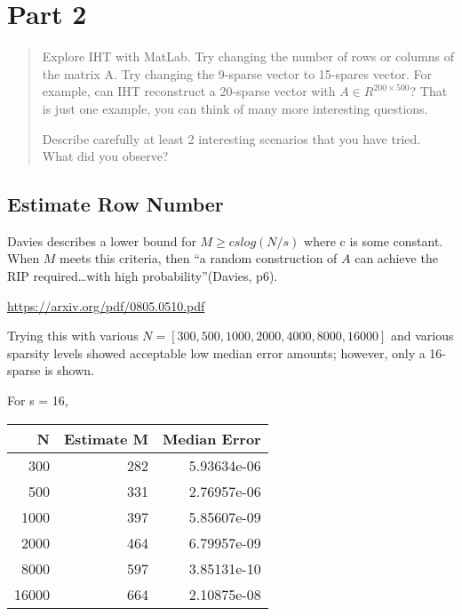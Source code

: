 \documentclass[11pt]{article}
\begin{document}
\section{Part 2}
\label{sec:orgb0db5c3}

\begin{quote}
Explore IHT with MatLab. Try changing the number of rows or columns of the
matrix A. Try changing the 9-sparse vector to 15-spares vector. For example, can
IHT reconstruct a 20-sparse vector with \(A \in R^{200 \times 500}\)? That is just
one example, you can think of many more interesting questions.

Describe carefully at least 2 interesting scenarios that you have tried. What
did you observe?
\end{quote}

\subsection{Estimate Row Number}
\label{sec:org899ffba}

Davies describes a lower bound for \(M \geq c s log(N / s)\) where c is some
constant. When \(M\) meets this criteria, then ``a random construction of \(A\) can
achieve the RIP required\ldots{}with high probability''(Davies, p6).

\url{https://arxiv.org/pdf/0805.0510.pdf}

Trying this with various \(N = [300, 500, 1000, 2000, 4000, 8000, 16000]\) and
various sparsity levels showed acceptable low median error amounts; however, only
a 16-sparse is shown.

For s = 16,

\begin{center}
\begin{tabular}{rrr}
N & Estimate M & Median Error\\
\hline
300 & 282 & 5.93634e-06\\
500 & 331 & 2.76957e-06\\
1000 & 397 & 5.85607e-09\\
2000 & 464 & 6.79957e-09\\
8000 & 597 & 3.85131e-10\\
16000 & 664 & 2.10875e-08\\
\end{tabular}
\end{center}
\end{document}

